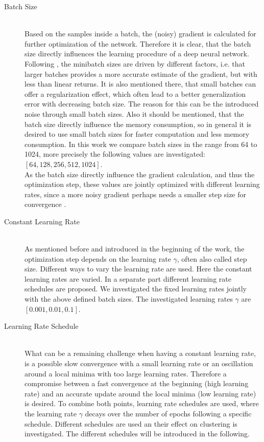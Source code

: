 \documentclass[12pt,DIV14,BCOR12mm,a4paper,footexclude,headinclude,halfparskip-,twoside,openright,cleardoubleempty,idxtotoc,bibtotoc,listtotoc]{scrreprt} %
\numberwithin{equation}{chapter}
\begin{document}
\begin{description}
	\item[Batch Size]\hfill \\
	Based on the samples inside a batch, the (noisy) gradient is calculated for further optimization of the network. Therefore it is clear, that the batch size directly influences the learning procedure of a deep neural network. Following \cite{Goodfellow-et-al-2016}, the minibatch sizes are driven by  different factors, i.e. that larger batches provides a more accurate estimate of the gradient, but with less than linear returns. It is also mentioned there, that small batches can offer a regularization effect, which often lead to a better generalization error with decreasing batch size. The reason for this can be the introduced noise through small batch sizes. Also it should be mentioned, that the batch size directly influence the memory consumption, so in general it is desired to use small batch sizes for faster computation and less memory consumption. In this work we compare batch sizes in the range from 64 to 1024, more precisely the following values are investigated: $[64, 128, 256, 512, 1024]$.\\ As the batch size directly influence the gradient calculation, and thus the optimization step, these values are jointly optimized with different learning rates, since a more noisy gradient perhaps needs a smaller step size for convergence \cite{Goodfellow-et-al-2016}.
	\item[Constant Learning Rate]\hfill \\
	As mentioned before and introduced in the beginning of the work, the optimization step depends on the learning rate $\gamma$, often also called step size. Different ways to vary the learning rate are used. Here the constant learning rates are varied. In a separate part different learning rate schedules are proposed. We investigated the fixed learning rates jointly with the above defined batch sizes. The investigated learning rates $\gamma$ are $[0.001, 0.01, 0.1]$.
	\item[Learning Rate Schedule]\hfill \\
	What can be a remaining challenge when having a constant learning rate, is a possible slow convergence with a small learning rate or an oscillation around a local minima with too large learning rates. Therefore a compromise between a fast convergence at the beginning (high learning rate) and an accurate update around the local minima (low learning rate) is desired. To combine both points, learning rate schedules are used, where the learning rate $\gamma$ decays over the number of epochs following a specific schedule. Different schedules are used an their effect on clustering is investigated. The different schedules will be introduced in the following.

\end{description}
\end{document}
